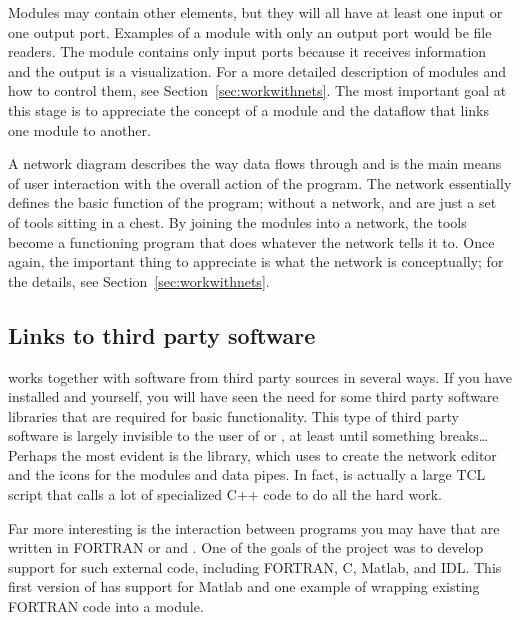 Modules may contain other elements, but they will all have at least one
input or one output port.  Examples of a module with only an output port
would be file readers.  The 
module contains only input ports because it receives information and the
output is a visualization.  For a more detailed description of modules and
how to control them, see Section~\ref{sec:workwithnets}.  The most
important goal at this stage is to appreciate the concept of a module and
the dataflow that links one module to another.

A network diagram  describes the way data flows
through \SR{} and is the main means of user interaction with the overall
action of the program.  The network essentially defines the basic function of
the program; without a network, \SR{} and \PSE{} are just a set of tools
sitting in a chest.  By joining the modules into a network, the tools
become a functioning program that does whatever the network tells it to.
Once again, the important thing to appreciate is what the network is
conceptually; for the details, see Section~\ref{sec:workwithnets}.


\subsection{Links to third party software}
\label{sec:con-links} 

\SR{} works together with software from third party sources in several
ways.  If you have installed \SR{} and \PSE{} yourself, you will have seen
the need for some third party software libraries that are required for
basic functionality.  This type of third party software is largely
invisible to the user of \SR{} or \PSE{}, at least until something
breaks\ldots{} Perhaps the most evident is the
  library,
which \SR{} uses to create the network editor and the icons for the modules
and data pipes.  In fact, \SR{} is actually a large TCL script that calls a
lot of specialized C++ code to do all the hard work.


Far more interesting is the interaction between programs you may have that
are written in FORTRAN  or
 and
\SR{}.  One of the goals of the \PSE{} project was to develop support for
such external code, including FORTRAN, C, Matlab, and IDL\@.  This first
version of \PSE{} has support for Matlab and one example of wrapping
existing FORTRAN code into a \SR{} module. 

